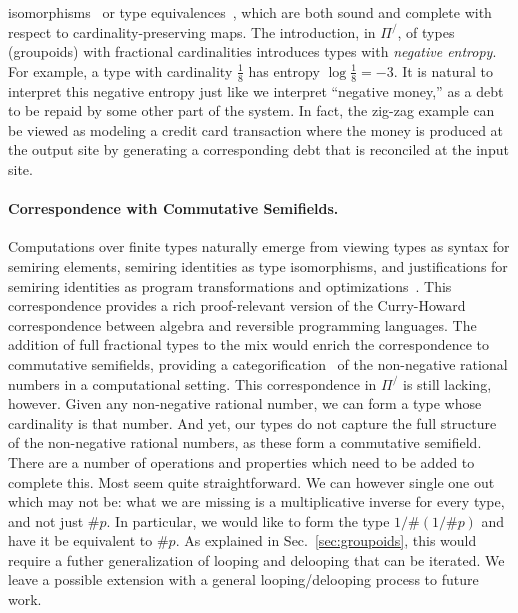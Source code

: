 \documentclass[a4paper,USenglish]{lipics-v2016-utf8x}
\newcommand{\hash}{\#}
\newcommand{\pifrac}{\ensuremath{\Pi^/}}
\newcommand{\order}[1]{\hash #1}
\newcommand{\iorder}[1]{1/\hash #1}
\begin{document}
isomorphisms~\cite{James:2012:IE:2103656.2103667} or type
equivalences~\cite{Carette2016}, which are both sound and complete with respect
to cardinality-preserving maps. The introduction, in $\pifrac$, of types
(groupoids) with fractional cardinalities introduces types with \emph{negative
  entropy}. For example, a type with cardinality $\frac{1}{8}$ has entropy
$\log{\frac{1}{8}} = -3$. It is natural to interpret this negative entropy just
like we interpret ``negative money,'' as a debt to be repaid by some other part
of the system. In fact, the zig-zag example can be viewed as modeling a credit
card transaction where the money is produced at the output site by generating a
corresponding debt that is reconciled at the input site.

\paragraph*{Correspondence with Commutative Semifields.} Computations over
finite types naturally emerge from viewing types as syntax for semiring
elements, semiring identities as type isomorphisms, and justifications for
semiring identities as program transformations and
optimizations~\cite{Carette2016}. This correspondence provides a rich
proof-relevant version of the Curry-Howard correspondence between algebra and
reversible programming languages. The addition of full fractional types to the
mix would enrich the correspondence to commutative semifields, providing a
categorification~\cite{math/9802029} of the non-negative rational numbers in a
computational setting. This correspondence in $\Pi^/$ is still lacking,
however. Given any non-negative rational number, we can form a type whose
cardinality is that number. And yet, our types do not capture the full structure
of the non-negative rational numbers, as these form a commutative
semifield. There are a number of operations and properties which need to be
added to complete this.  Most seem quite straightforward.  We can however single
one out which may not be: what we are missing is a multiplicative inverse for
every type, and not just $\order{p}$. In particular, we would like to form the
type $\iorder{(\iorder{p})}$ and have it be equivalent to $\order{p}$.  As
explained in Sec.~\ref{sec:groupoids}, this would require a futher
generalization of looping and delooping that can be iterated. We leave a
possible extension with a general looping/delooping process to future work.



\end{document}
